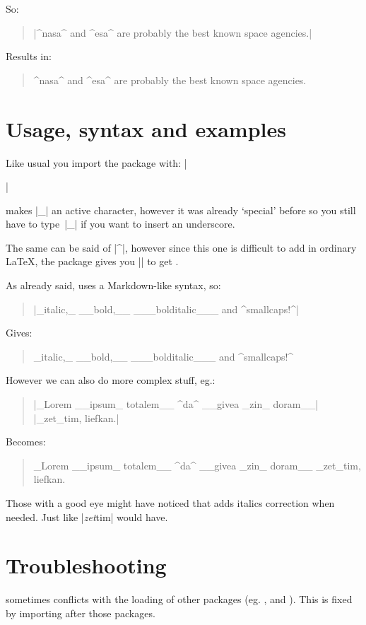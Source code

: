 \documentclass[11pt, cm-default]{l3doc}
\begin{document}
	So:
	\begin{quote}
		|^nasa^ and ^esa^ are probably the best known space agencies.|
	\end{quote}

	Results in:
	\begin{quote}
		^nasa^ and ^esa^ are probably the best known space agencies.
	\end{quote}


	\section{Usage, syntax and examples}
	Like usual you import the package with: |\usepackage{easyformat}|

	 makes |_| an active character, however it was already `special' before so you still have to type~|\_| if you want to insert an underscore.
	
	The same can be said of |^|, however since this one is difficult to add in ordinary \LaTeX, the  package gives you |\cir| to get \cir.
	
	\newpage

	As already said,  uses a Markdown-like syntax, so:
	
	\begin{quote}
		|_italic,_ __bold,__ ___bolditalic___ and ^smallcaps!^|
	\end{quote}

	Gives:
	\begin{quote}
		_italic,_ __bold,__ ___bolditalic___ and ^smallcaps!^
	\end{quote}

	However we can also do more complex stuff, eg.:
	\begin{quote}
		|_Lorem __ipsum_ totalem__ ^da^ __givea _zin_ doram__|\\
		|_zet_tim, liefkan.|
	\end{quote}
	
	Becomes:
	\begin{quote}
		_Lorem __ipsum_ totalem__ ^da^ __givea _zin_ doram__ _zet_tim, liefkan.
	\end{quote}

	Those with a good eye might have noticed that  adds italics correction when needed. Just like |\textit{zet}tim| would have.


	\section{Troubleshooting}
	 sometimes conflicts with the loading of other packages (eg. ,  and ). This is fixed by importing  after those packages.
	
\end{document}
